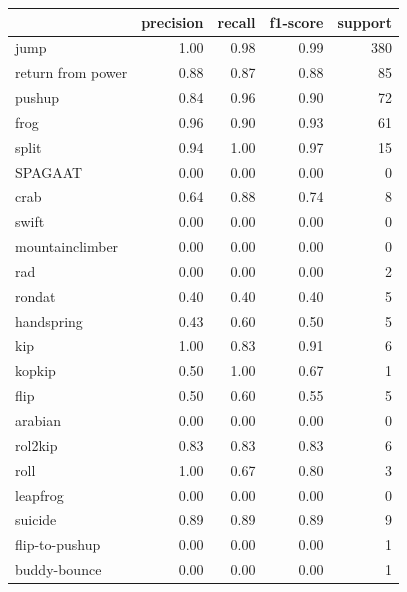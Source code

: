 \begin{table}[h!]
    \begin{tabular}{|l|r|r|r|r|}
                \hline & precision &   recall & f1-score &  support \\ \hline
                jump &      1.00 &     0.98 &     0.99 &      380 \\
   return from power &      0.88 &     0.87 &     0.88 &       85 \\
              pushup &      0.84 &     0.96 &     0.90 &       72 \\
                frog &      0.96 &     0.90 &     0.93 &       61 \\
               split &      0.94 &     1.00 &     0.97 &       15 \\
             SPAGAAT &      0.00 &     0.00 &     0.00 &        0 \\
                crab &      0.64 &     0.88 &     0.74 &        8 \\
               swift &      0.00 &     0.00 &     0.00 &        0 \\
     mountainclimber &      0.00 &     0.00 &     0.00 &        0 \\
                 rad &      0.00 &     0.00 &     0.00 &        2 \\
              rondat &      0.40 &     0.40 &     0.40 &        5 \\
          handspring &      0.43 &     0.60 &     0.50 &        5 \\
                 kip &      1.00 &     0.83 &     0.91 &        6 \\
              kopkip &      0.50 &     1.00 &     0.67 &        1 \\
                flip &      0.50 &     0.60 &     0.55 &        5 \\
             arabian &      0.00 &     0.00 &     0.00 &        0 \\
             rol2kip &      0.83 &     0.83 &     0.83 &        6 \\
                roll &      1.00 &     0.67 &     0.80 &        3 \\
            leapfrog &      0.00 &     0.00 &     0.00 &        0 \\
             suicide &      0.89 &     0.89 &     0.89 &        9 \\
      flip-to-pushup &      0.00 &     0.00 &     0.00 &        1 \\
        buddy-bounce &      0.00 &     0.00 &     0.00 &        1 \\

\end{tabular}
\end{table}
